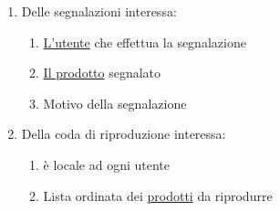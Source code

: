 \begin{enumerate}
\item \hypertarget{AnReqSegnalazioni}{Delle segnalazioni interessa:}
	\begin{enumerate}[label*=\arabic*.]
	\item \hyperlink{AnReqUt}{L'utente} che effettua la segnalazione
	\item \hyperlink{AnReqProdMult}{Il prodotto} segnalato
	\item Motivo della segnalazione
	\end{enumerate} 

\item \hypertarget{AnReqCodaRip}{Della coda di riproduzione interessa:}
	\begin{enumerate}[label*=\arabic*.]
	\item è locale ad ogni utente
	\item Lista ordinata dei \hyperlink{AnReqUt}{prodotti} da riprodurre
	\end{enumerate} 


\end{enumerate}


